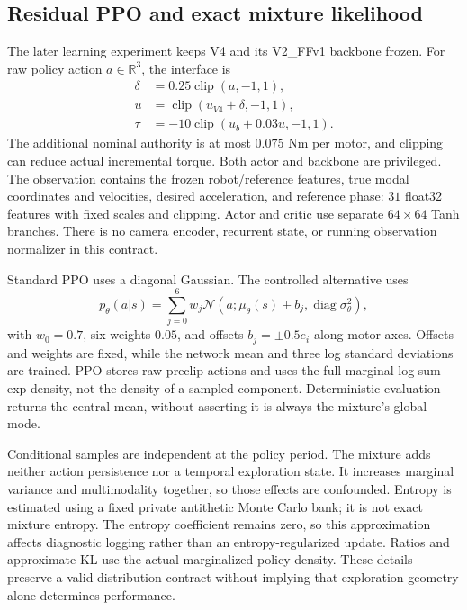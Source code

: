 \subsection{Residual PPO and exact mixture likelihood}
The later learning experiment keeps V4 and its V2\_FFv1 backbone frozen. For raw policy action $a\in\mathbb R^3$, the interface is
\begin{align}
 \delta&=0.25\operatorname{clip}(a,-1,1),\\
 u&=\operatorname{clip}(u_{V4}+\delta,-1,1),\\
 \tau&=-10\operatorname{clip}(u_b+0.03u,-1,1).
\end{align}
The additional nominal authority is at most $0.075$ Nm per motor, and clipping can reduce actual incremental torque. Both actor and backbone are privileged. The observation contains the frozen robot/reference features, true modal coordinates and velocities, desired acceleration, and reference phase: $31$ float32 features with fixed scales and clipping. Actor and critic use separate $64\times64$ Tanh branches. There is no camera encoder, recurrent state, or running observation normalizer in this contract.

Standard PPO uses a diagonal Gaussian. The controlled alternative uses
\begin{equation}
 p_\theta(a|s)=\sum_{j=0}^{6}w_j\mathcal N(a;\mu_\theta(s)+b_j,\operatorname{diag}\sigma_\theta^2),
\end{equation}
with $w_0=0.7$, six weights $0.05$, and offsets $b_j=\pm0.5e_i$ along motor axes. Offsets and weights are fixed, while the network mean and three log standard deviations are trained. PPO stores raw preclip actions and uses the full marginal log-sum-exp density, not the density of a sampled component. Deterministic evaluation returns the central mean, without asserting it is always the mixture's global mode.

Conditional samples are independent at the policy period. The mixture adds neither action persistence nor a temporal exploration state. It increases marginal variance and multimodality together, so those effects are confounded. Entropy is estimated using a fixed private antithetic Monte Carlo bank; it is not exact mixture entropy. The entropy coefficient remains zero, so this approximation affects diagnostic logging rather than an entropy-regularized update. Ratios and approximate KL use the actual marginalized policy density. These details preserve a valid distribution contract without implying that exploration geometry alone determines performance.



